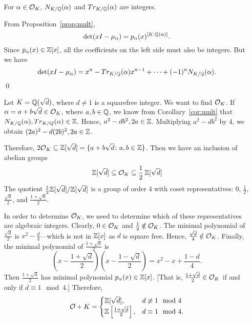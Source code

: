 \begin{cor}\label{cor:mult}
For $\alpha \in \mathcal{O}_K$, $N_{K/\mathbb{Q}}(\alpha)$ and $Tr_{K/\mathbb{Q}}(\alpha)$ are integers.
\end{cor}

\pf From Proposition~\ref{prop:mult}, 
	\[
	\det(xI - \mu_\alpha)= p_\alpha(x)^{[K:\mathbb{Q}(\alpha)]}.
	\]
Since $p_\alpha(x) \in \mathbb{Z}[x]$, all the coefficients on the left side must also be integers. But we have
	\[
	\det(xI-\mu_\alpha)=x^n - Tr_{K/\mathbb{Q}}(\alpha)x^{n-1} + \cdots + (-1)^n N_{K/\mathbb{Q}}(\alpha).
	\] \qed \\


\begin{ex}
Let $K=\mathbb{Q}(\sqrt{d})$, where $d\neq 1$ is a squarefree integer. We want to find $\mathcal{O}_K$. If $\alpha=a+b\sqrt{d} \in \mathcal{O}_K$, where $a,b \in \mathbb{Q}$, we know from Corollary~\ref{cor:mult} that $N_{K/\mathbb{Q}}(\alpha),Tr_{K/Q}(\alpha) \in \mathbb{Z}$. Hence, $a^2-db^2,2a \in \mathbb{Z}$. Multiplying $a^2-db^2$ by 4, we obtain $(2a)^2-d(2b)^2,2a \in \mathbb{Z}$. 

Therefore, $2\mathcal{O}_K \subseteq \mathbb{Z}[\sqrt{d}]=\{a+b\sqrt{d} \colon a,b \in \mathbb{Z}\}$. Then we have an inclusion of abelian groups
	\[
	\mathbb{Z}[\sqrt{d}] \subseteq \mathcal{O}_K \subseteq \dfrac{1}{2}\, \mathbb{Z}[\sqrt{d}]
	\]
The quotient $\frac{1}{2}\mathbb{Z}[\sqrt{d}]/\mathbb{Z}[\sqrt{d}]$ is a group of order 4 with coset representatives: 0, $\frac{1}{2}$, $\frac{\sqrt{d}}{2}$, and $\frac{1+\sqrt{d}}{2}$. 

In order to determine $\mathcal{O}_K$, we need to determine which of these representatives are algebraic integers. Clearly, $0 \in \mathcal{O}_K$ and $\frac{1}{2} \notin \mathcal{O}_K$. The minimal polynomial of $\frac{\sqrt{d}}{2}$ is $x^2 - \frac{d}{4}$---which is not in $\mathbb{Z}[x]$ as $d$ is square free. Hence, $\frac{\sqrt{d}}{4} \notin \mathcal{O}_K$. Finally, the minimal polynomial of $\frac{1+\sqrt{d}}{2}$ is
	\[
	\left(x - \dfrac{1+\sqrt{d}}{2}\right) \left(x - \dfrac{1-\sqrt{d}}{2}\right)= x^2-x+ \dfrac{1-d}{4}.
	\]
Then $\frac{1+\sqrt{d}}{2}$ has minimal polynomial $p_\alpha(x) \in \mathbb{Z}[x]$. [That is, $\frac{1+\sqrt{d}}{2} \in \mathcal{O}_K$ if and only if $d \equiv 1 \mod 4$.] Therefore,
	\[
	\mathcal{O}+K=
	\begin{cases}
	\mathbb{Z}[\sqrt{d}], & d \not\equiv 1 \mod 4 \\
	\mathbb{Z}\left[\frac{1+\sqrt{d}}{2}\right], & d \equiv 1 \mod 4.
	\end{cases}
	\]
\xqed
\end{ex}


